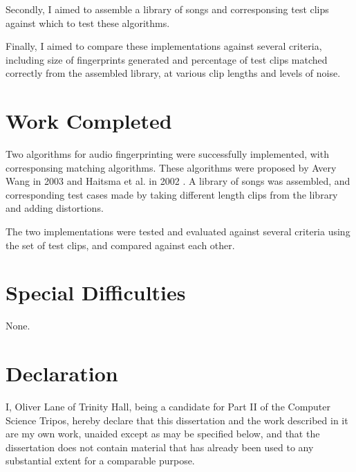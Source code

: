 \documentclass[12pt,a4paper,twoside,openright]{report}
\begin{document}
Secondly, I aimed to assemble a library of songs and corresponsing test clips against which to test these algorithms.

Finally, I aimed to compare these implementations against several criteria, including size of fingerprints generated and percentage of test clips matched correctly from the assembled library, at various clip lengths and levels of noise.

\section*{Work Completed}

Two algorithms for audio fingerprinting were successfully implemented, with corresponsing matching algorithms. These algorithms were proposed by Avery Wang in 2003 \cite{Wang03} and Haitsma et al. in 2002 \cite{Haitsma02}. A library of songs was assembled, and corresponding test cases made by taking different length clips from the library and adding distortions.

The two implementations were tested and evaluated against several criteria using the set of test clips, and compared against each other.

\section*{Special Difficulties}

None.

 
\newpage
\section*{Declaration}

I, Oliver Lane of Trinity Hall, being a candidate for Part II of the Computer Science Tripos, hereby declare that this dissertation and the work described in  it are my own work, unaided except as may be specified below, and that the  dissertation does not contain material that has already been used to any  substantial extent for a comparable purpose.

\bigskip
\bigskip
\bigskip


\bigskip
\bigskip


\tableofcontents



\end{document}
